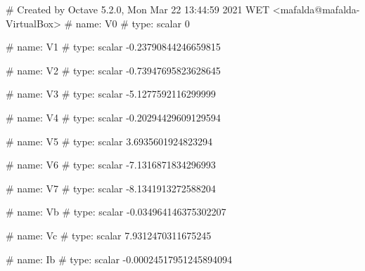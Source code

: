 # Created by Octave 5.2.0, Mon Mar 22 13:44:59 2021 WET <mafalda@mafalda-VirtualBox>
# name: V0
# type: scalar
0


# name: V1
# type: scalar
-0.23790844246659815


# name: V2
# type: scalar
-0.73947695823628645


# name: V3
# type: scalar
-5.1277592116299999


# name: V4
# type: scalar
-0.20294429609129594


# name: V5
# type: scalar
3.6935601924823294


# name: V6
# type: scalar
-7.1316871834296993


# name: V7
# type: scalar
-8.1341913272588204


# name: Vb
# type: scalar
-0.034964146375302207


# name: Vc
# type: scalar
7.9312470311675245


# name: Ib
# type: scalar
-0.00024517951245894094



